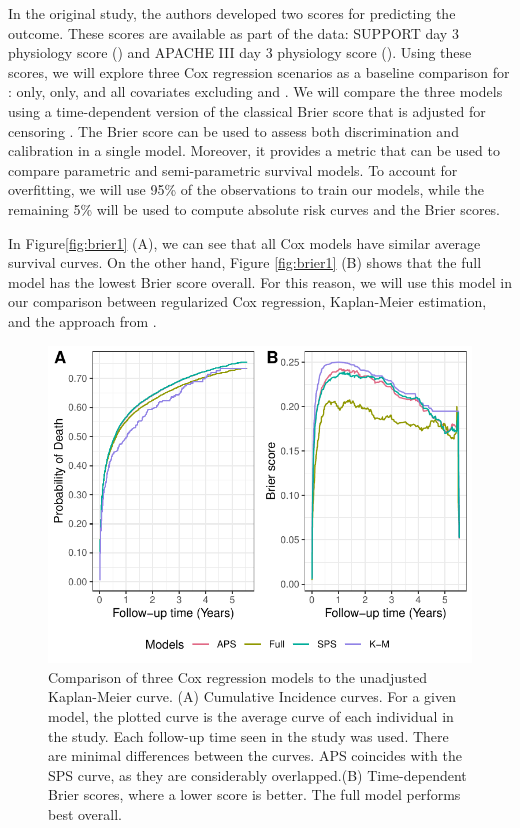 \documentclass[
]{jss}
\begin{document}
In the original study, the authors developed two scores for predicting
the outcome. These scores are available as part of the data: SUPPORT day
3 physiology score () and APACHE III day 3 physiology score
(). Using these scores, we will explore three Cox regression
scenarios as a baseline comparison for :  only,
 only, and all covariates excluding  and .
We will compare the three models using a time-dependent version of the
classical Brier score that is adjusted for censoring
\citep{graf1999ass}. The Brier score can be used to assess both
discrimination and calibration in a single model. Moreover, it provides
a metric that can be used to compare parametric and semi-parametric
survival models. To account for overfitting, we will use 95\% of the
observations to train our models, while the remaining 5\% will be used
to compute absolute risk curves and the Brier scores.

In Figure\ref{fig:brier1} (A), we can see that all Cox models have
similar average survival curves. On the other hand, Figure
\ref{fig:brier1} (B) shows that the full model has the lowest Brier
score overall. For this reason, we will use this model in our comparison
between regularized Cox regression, Kaplan-Meier estimation, and the
approach from .

\begin{CodeChunk}
\begin{figure}

{\centering \includegraphics[width=\textwidth,keepaspectratio=true]{../figures/brierpt1-1} 

}

\caption{\label{fig:brier1} Comparison of three Cox regression models to the unadjusted Kaplan-Meier curve. (A) Cumulative Incidence curves. For a given model, the plotted curve is the average curve of each individual in the study. Each follow-up time seen in the study was used. There are minimal differences between the curves. APS coincides with the SPS curve, as they are considerably overlapped.(B) Time-dependent Brier scores, where a lower score is better. The full model performs best overall.}\label{fig:brierpt1}
\end{figure}
\end{CodeChunk}
\end{document}
